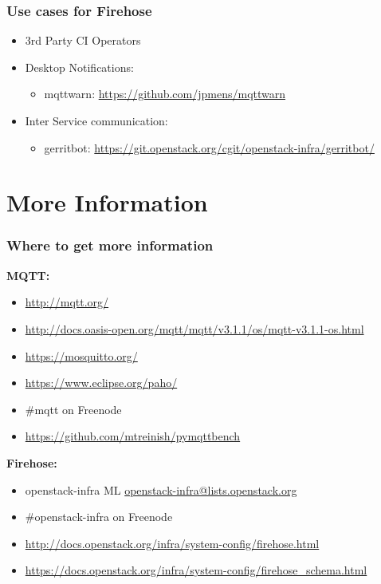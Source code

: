 \documentclass[aspectratio=169,11pt,hyperref={colorlinks=true}]{beamer}
\begin{document}
\begin{frame}
    \frametitle{Use cases for Firehose}
    \begin{itemize}
        \item 3rd Party CI Operators
        \item Desktop Notifications:
            \begin{itemize}
                \item mqttwarn: \href{https://github.com/jpmens/mqttwarn}{https://github.com/jpmens/mqttwarn}
            \end{itemize}
        \item Inter Service communication:
            \begin{itemize}
                \item gerritbot: \href{https://git.openstack.org/cgit/openstack-infra/gerritbot/}{https://git.openstack.org/cgit/openstack-infra/gerritbot/}
            \end{itemize}

    \end{itemize}
\end{frame}

\section{More Information}
\begin{frame}
\frametitle{Where to get more information}
    \textbf{MQTT:}
    \begin{itemize}
	    \item \href{http://mqtt.org/}{http://mqtt.org/}
        \item \href{http://docs.oasis-open.org/mqtt/mqtt/v3.1.1/os/mqtt-v3.1.1-os.html}{http://docs.oasis-open.org/mqtt/mqtt/v3.1.1/os/mqtt-v3.1.1-os.html}
	    \item \href{https://mosquitto.org/}{https://mosquitto.org/}
        \item \href{https://www.eclipse.org/paho/}{https://www.eclipse.org/paho/}
        \item \#mqtt on Freenode
        \item \href{https://github.com/mtreinish/pymqttbench}{https://github.com/mtreinish/pymqttbench}
    \end{itemize}
    \textbf{Firehose:}
    \begin{itemize}
        \item openstack-infra ML\: \href{mailto:openstack-infra@lists.openstack.org}{openstack-infra@lists.openstack.org}
        \item \#openstack-infra on Freenode
	    \item \href{http://docs.openstack.org/infra/system-config/firehose.html}{http://docs.openstack.org/infra/system-config/firehose.html}
        \item \href{https://docs.openstack.org/infra/system-config/firehose_schema.html}{https://docs.openstack.org/infra/system-config/firehose\_schema.html}
    \end{itemize}
\end{frame}
\end{document}
